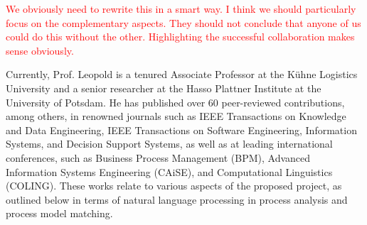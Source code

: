 \documentclass{scrartcl}
\newcommand\todo[1]{\textcolor{red}{#1}}
\begin{document}
\todo{We obviously need to rewrite this in a smart way. I think we should particularly focus on the complementary aspects. They should not conclude that anyone of us could do this without the other. Highlighting the successful collaboration makes sense obviously.}

Currently, Prof. Leopold is a tenured Associate Professor at the Kühne Logistics University and a senior researcher at the Hasso Plattner Institute at the University of Potsdam. He has published over 60 peer-reviewed contributions, among others, in renowned journals such as IEEE Transactions on Knowledge and Data Engineering, IEEE Transactions on Software Engineering, Information Systems, and Decision Support Systems, as well as at leading international conferences, such as Business Process Management (BPM), Advanced Information Systems Engineering (CAiSE), and Computational Linguistics (COLING). These works relate to various aspects of the proposed project, as outlined below in terms of natural language processing in process analysis and process model matching.


\end{document}
